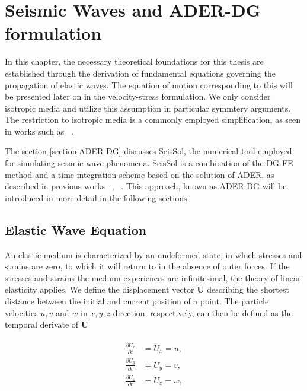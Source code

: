 
\chapter{Seismic Waves and ADER-DG formulation}\label{chapter:seismicwaves}
In this chapter, the necessary theoretical foundations for this thesis are established through the derivation of fundamental equations governing the propagation of elastic waves.
The equation of motion corresponding to this will be presented later on in the velocity-stress formulation.
We only consider isotropic media and utilize this assumption in particular symmtery arguments. The restriction to isotropic media is a commonly employed simplification, as seen in works such as ~\parencite{dumbser1}.

The section \ref{section:ADER-DG} discusses SeisSol, the numerical tool employed for simulating seismic wave phenomena. SeisSol is a combination
of the \ac{DG-FE} method and a time integration scheme based on the solution of \ac{ADER}, as described in previous works ~\parencite{dumbser1}, ~\parencite{seissol}. This approach, known as 
\ac{ADER}-\ac{DG} will be introduced in more detail in the following sections.

\section{Elastic Wave Equation}\label{section:elasticwaveequation}
An elastic medium is characterized by an undeformed state, in which stresses and strains are zero, to which it will return to in the absence
of outer forces. If the stresses and strains the medium experiences are infinitesimal, the theory of linear elasticity applies. We define
the displacement vector $\mathbf{U}$ describing the shortest distance between the initial and current position of a point. The particle
velocities $u,v$ and $w$ in $x, y, z$ direction, respectively, can then be defined as the temporal derivate of $\mathbf{U}$

\begin{align}
    \begin{split}
    \frac{\partial U_x}{\partial t} &= \dot{U}_x = u, \\
    \frac{\partial U_y}{\partial t} &= \dot{U}_y = v, \\
    \frac{\partial U_z}{\partial t} &= \dot{U}_z = w, \\
    \end{split}
 \end{align}

